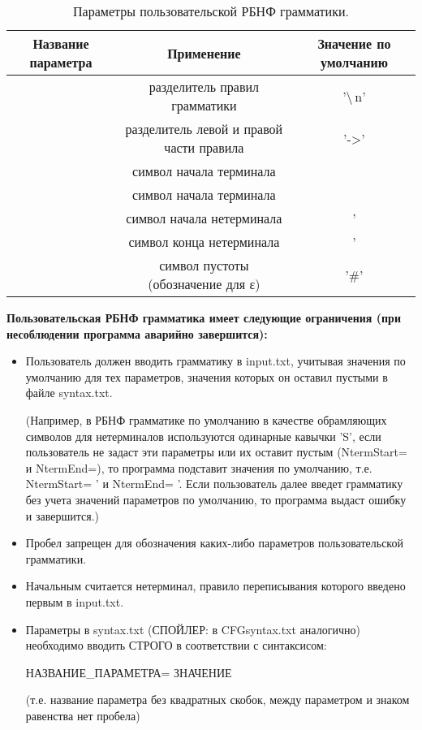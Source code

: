 \documentclass{article}
\begin{document}
\begin{table}[h!]
\centering
\begin{tabular}{ |c | c | c| }
\hline 
Название параметра & Применение	& Значение по умолчанию \\ [0.5ex]
\hline
[Delim]	& разделитель правил грамматики	& '\backslash\,n' \\ [0.5ex]
\hline
[Arrow]	& разделитель левой и правой части правила	& '->' \\ [0.5ex]
\hline
[TermStart]	& символ начала терминала &  \\ [0.5ex]
\hline
[TermEnd] & символ начала терминала &  \\ [0.5ex]
\hline
[NtermStart] & символ начала нетерминала & ' \\ [0.5ex]
\hline
[NtermEnd] & символ конца нетерминала & ' \\ [0.5ex]
\hline
[Empty] & символ пустоты (обозначение для ε) & '\#' \\ [0.5ex]
\hline
\end{tabular}
\caption{Параметры пользовательской РБНФ грамматики.}
\end{table}

\newline
\textbf{Пользовательская РБНФ грамматика имеет следующие ограничения (при несоблюдении программа аварийно завершится):}

\begin{itemize}
\item Пользователь должен вводить грамматику в input.txt, учитывая значения по умолчанию для тех параметров, значения которых он оставил пустыми в файле syntax.txt.

(Например, в РБНФ грамматике по умолчанию в качестве обрамляющих символов для нетерминалов используются одинарные кавычки 'S', если пользователь не задаст эти параметры или их оставит пустым (NtermStart= и NtermEnd=), то программа подставит значения по умолчанию, т.е.
NtermStart= ' и NtermEnd= '. Если пользователь далее введет грамматику без учета значений параметров по умолчанию, то программа выдаст ошибку и завершится.)
\item Пробел запрещен для обозначения каких-либо параметров пользовательской грамматики.
\item Начальным считается нетерминал, правило переписывания которого введено первым в input.txt.
\item Параметры в syntax.txt (СПОЙЛЕР: в CFGsyntax.txt аналогично) необходимо вводить СТРОГО в соответствии с синтаксисом: 

НАЗВАНИЕ\_ПАРАМЕТРА= ЗНАЧЕНИЕ  

(т.е. название параметра без квадратных скобок, между параметром и знаком равенства нет пробела)
\end{itemize}
\end{document}
